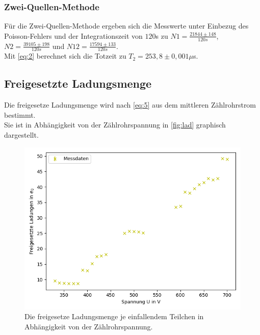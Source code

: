 \subsubsection{Zwei-Quellen-Methode}
 Für die Zwei-Quellen-Methode ergeben sich die Messwerte unter Einbezug des 
 Poisson-Fehlers und der Integrationszeit von $120$s zu $N1 = \frac{21844 \pm 148}{120s}$, $N2 = \frac{39105 \pm 198}{120s}$ 
 und $N12 = \frac{17594 \pm 133}{120s}$.\\
 Mit \autoref{eq:2} berechnet sich die Totzeit zu $T_2 = 253,8 \pm 0,001 \mu$s.




\subsection{Freigesetzte Ladungsmenge}

Die freigesetze Ladungsmenge wird nach \autoref{eq:5} aus dem mittleren Zählrohrstrom
bestimmt.\\
Sie ist in Abhängigkeit von der Zählrohrspannung in \autoref{fig:lad} graphisch dargestellt.\\
\begin{figure}[H]
  \centering
  \includegraphics{content/figure_2.png}
  \caption{Die freigesetze Ladungsmenge je einfallendem Teilchen in Abhängigkeit von der Zählrohrspannung.}
  \label{fig:lad}
\end{figure}


